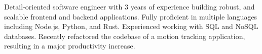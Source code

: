 

\begin{cvparagraph}

Detail-oriented software engineer with 3 years of experience building robust, and scalable frontend and backend applications. Fully proficient in multiple languages including Node.js, Python, and Rust. Experienced working with SQL and NoSQL databases. Recently refactored the codebase of a motion tracking application, resulting in a major productivity increase.

\end{cvparagraph}
